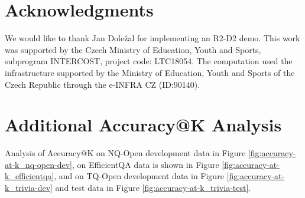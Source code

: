 \documentclass[11pt]{article}
\begin{document}
\section*{Acknowledgments}
We would like to thank Jan Doležal for implementing an R2-D2 demo.
This work was supported by the Czech Ministry of Education, Youth and Sports, subprogram INTERCOST, project code: LTC18054.
The computation used the infrastructure supported by the Ministry of Education, Youth and Sports of the Czech Republic through the e-INFRA CZ (ID:90140).






\appendix
\clearpage



\section{Additional Accuracy@K Analysis}
\label{app:accuracy_at_k}
Analysis of Accuracy@K on NQ-Open development data in Figure \ref{fig:accuracy-at-k_nq-open-dev}, on EfficientQA data is shown in Figure \ref{fig:accuracy-at-k_efficientqa}, and on TQ-Open development data in Figure \ref{fig:accuracy-at-k_trivia-dev} and test data in Figure \ref{fig:accuracy-at-k_trivia-test}. 
\end{document}
